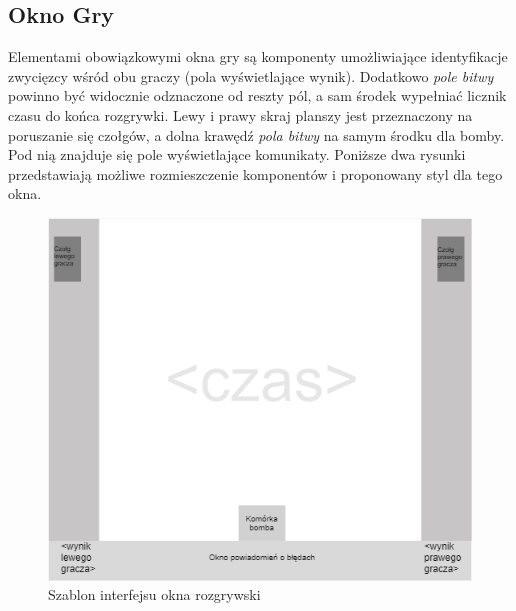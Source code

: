 \documentclass[11pt,a4paper]{report}
\begin{document}
\subsection{Okno Gry}
Elementami obowiązkowymi okna gry są komponenty umożliwiające identyfikacje zwycięzcy wśród obu graczy (pola wyświetlające wynik). Dodatkowo \textsl{pole bitwy} powinno być widocznie odznaczone od reszty pól, a sam środek wypełniać licznik czasu do końca rozgrywki. Lewy i prawy skraj planszy jest przeznaczony na poruszanie się czołgów, a dolna krawędź \textsl{pola bitwy} na samym środku dla bomby. Pod nią znajduje się pole wyświetlające komunikaty. Poniższe dwa rysunki przedstawiają możliwe rozmieszczenie komponentów i proponowany styl dla tego okna.
\begin{figure}[!ht]
\centerline{\includegraphics{img/game1.png}}
\caption{Szablon interfejsu okna rozgrywski}
\end{figure}
\newpage
\end{document}
